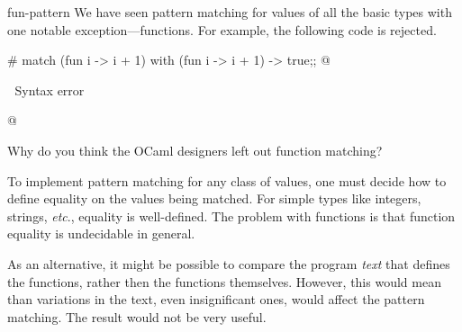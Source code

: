 %
\begin{exercise}{fun-pattern}
We have seen pattern matching for values of all the basic types with one notable
exception---functions.  For example, the following code is rejected.

\begin{ocaml}
# match (fun i -> i + 1) with
     (fun i -> i + 1) -> true;;
@
\begin{toperror}
      ^^^
Syntax error
\end{toperror}
@
\end{ocaml}
%
Why do you think the OCaml designers left out function matching?

\begin{answer}\ifanswers
To implement pattern matching for any class of values, one must decide how to define equality on the
values being matched.  For simple types like integers, strings, \emph{etc}., equality is
well-defined.  The problem with functions is that function equality is undecidable in general.

As an alternative, it might be possible to compare the program \emph{text} that defines the
functions, rather then the functions themselves.  However, this would mean than variations in the
text, even insignificant ones, would affect the pattern matching.  The result would not be very
useful.
\fi\end{answer}
\end{exercise}


